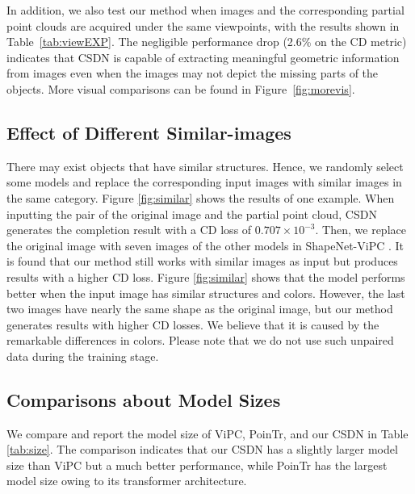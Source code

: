 In addition, we also test our method when images and the corresponding partial point clouds are acquired under the same viewpoints, with the results shown in Table~\ref{tab:viewEXP}. The negligible performance drop (2.6\% on the CD metric) indicates that CSDN is capable of extracting meaningful geometric information from images even when the images may not depict the missing parts of the objects. More visual comparisons can be found in Figure~\ref{fig:morevis}.

\subsection{Effect of Different Similar-images}
There may exist objects that have similar structures. Hence, we randomly select some models and replace the corresponding input images with similar images in the same category. 
Figure \ref{fig:similar} shows the results of one example. When inputting the pair of the original image and the partial point cloud, CSDN generates the completion result with a CD loss of $0.707 \times 10^{-3}$. 
Then, we replace the original image with seven images of the other models in ShapeNet-ViPC \cite{zhang2021view}. It is found that our method still works with similar images as input but produces results with a higher CD loss. Figure \ref{fig:similar} shows that the model performs better when the input image has similar structures and colors.
However, the last two images have nearly the same shape as the original image, but our method generates results with higher CD losses. We believe that it is caused by the remarkable differences in colors. Please note that we do not use such unpaired data during the training stage.
\subsection{Comparisons about Model Sizes}
We compare and report the model size of ViPC, PoinTr, and our CSDN in Table \ref{tab:size}. 
The comparison indicates that our CSDN has a slightly larger model size than ViPC but a much better performance, while PoinTr has the largest model size owing to its transformer architecture.

